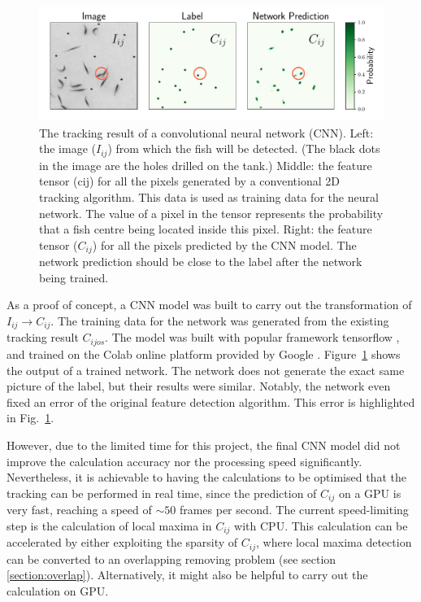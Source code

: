\documentclass[11pt,twoside]{report}
\begin{document}
\begin{figure}
  \includegraphics[width=\linewidth]{locate-cnn}
  \caption[The feature tensor calculated with convolutional neural network]{
	The tracking result of a convolutional neural network (CNN).
	Left: the image ($I_{ij}$) from which the fish will be detected. (The black dots in the image are the holes drilled on the tank.)
	Middle: the feature tensor (\gls{cij}) for all the pixels generated by a conventional 2D tracking algorithm. This data is used as training data for the neural network. The value of a pixel in the tensor represents the probability that a fish centre being located inside this pixel. 
	Right: the feature tensor ($C_{ij}$) for all the pixels predicted by the CNN model. The network prediction should be close to the label after the network being trained.
  }
  \label{fig:locate-cnn}
\end{figure}


As a proof of concept, a CNN model was built to carry out the transformation of $I_{ij} \rightarrow C_{ij}$. The training data for the network was generated from the existing tracking result $C_{ijos}$.
The model was built with popular framework tensorflow \cite{tensorflow2015}, and trained on the Colab online platform provided by Google \cite{carneiro2018}.
Figure~\ref{fig:locate-cnn} shows the output of a trained network. The network does not generate the exact same picture of the label, but their results were similar. Notably, the network even fixed an error of the original feature detection algorithm. This error is highlighted in Fig.~\ref{fig:locate-cnn}. 

However, due to the limited time for this project, the final CNN model did not improve the calculation accuracy nor the processing speed significantly. Nevertheless, it is achievable to having the calculations to be optimised that the tracking can be performed in real time, since the prediction of $C_{ij}$ on a GPU is very fast, reaching a speed of $\sim 50$ frames per second. The current speed-limiting step is the calculation of local maxima in $C_{ij}$ with CPU. This calculation can be accelerated by either exploiting the sparsity of $C_{ij}$, where local maxima detection can be converted to an overlapping removing problem (see section \ref{section:overlap}). Alternatively, it might also be helpful to carry out the calculation on GPU.
\end{document}
